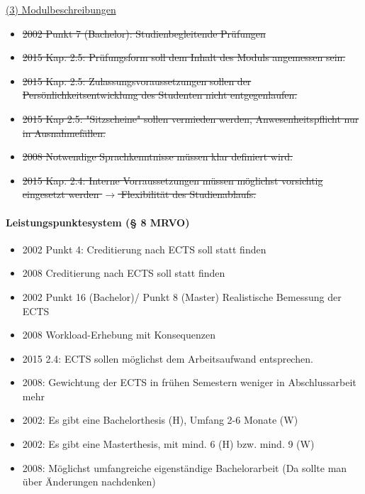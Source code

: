         \underline{(3) Modulbeschreibungen}
          \begin{itemize}
            \item \sout{2002 Punkt 7 (Bachelor): Studienbegleitende Prüfungen}
            \item \sout{2015 Kap. 2.5: Prüfungsform soll dem Inhalt des Moduls angemessen sein.}
            \item \sout{2015 Kap. 2.5: Zulassungsvoraussetzungen sollen der Persönlichkeitsentwicklung des Studenten nicht entgegenlaufen.}
            \item \sout{2015 Kap 2.5:  "Sitzscheine" sollen vermieden werden, Anwesenheitspflicht nur in Ausnahmefällen.}
            \item \sout{2008 Notwendige Sprachkenntnisse müssen klar definiert wird.}
            \item \sout{2015 Kap. 2.4: Interne Vorraussetzungen müssen möglichst vorsichtig eingesetzt werden $\rightarrow$ Flexibilität des Studienablaufs.}
          \end{itemize}




    \paragraph{Leistungspunktesystem (§ 8 MRVO)}
      \begin{itemize}
        \item 2002 Punkt 4: Creditierung nach ECTS soll statt finden
        \item 2008 Creditierung nach ECTS soll statt finden
        \item 2002 Punkt 16 (Bachelor)/ Punkt 8 (Master) Realistische Bemessung der ECTS
        \item 2008 Workload-Erhebung mit Konsequenzen
        \item 2015 2.4: ECTS sollen möglichst dem Arbeitsaufwand entsprechen.
        \item 2008: Gewichtung der ECTS in frühen Semestern weniger in Abschlussarbeit mehr
        \item 2002: Es gibt eine Bachelorthesis (H), Umfang 2-6 Monate (W)
        \item 2002: Es gibt eine Masterthesis, mit mind. 6 (H) bzw. mind. 9 (W)
        \item 2008: Möglichst umfangreiche eigenständige Bachelorarbeit (Da sollte man über Änderungen nachdenken)
      \end{itemize}


